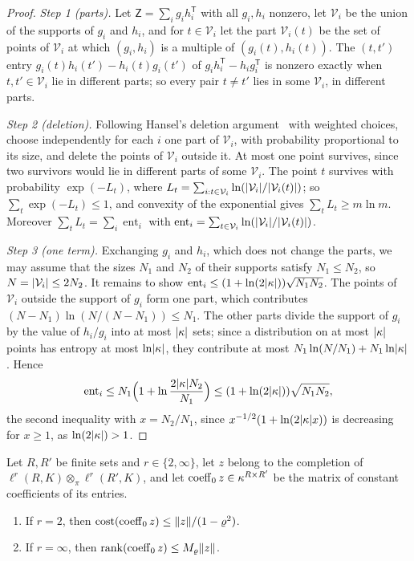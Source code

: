 \begin{proof}
\emph{Step 1 (parts).} Let $\mathsf Z=\sum_ig_ih_i^{\mathsf T}$ with all $g_i,h_i$ nonzero, let $\mathcal V_i$ be the
union of the supports of $g_i$ and $h_i$, and for $t\in\mathcal V_i$ let the part $\mathcal V_i(t)$ be the set of points
of $\mathcal V_i$ at which $(g_i,h_i)$ is a multiple of $(g_i(t),h_i(t))$. The $(t,t')$ entry
$g_i(t)h_i(t')-h_i(t)g_i(t')$ of $g_ih_i^{\mathsf T}-h_ig_i^{\mathsf T}$ is nonzero exactly when $t,t'\in\mathcal V_i$ lie
in different parts; so every pair $t\ne t'$ lies in some $\mathcal V_i$, in different parts.

\emph{Step 2 (deletion).} Following Hansel's deletion argument~\cite{Ha} with weighted choices, choose independently
for each $i$ one part of $\mathcal V_i$, with probability proportional to its size, and delete the points of $\mathcal V_i$
outside it. At most one point survives, since two survivors would lie in different parts of some $\mathcal V_i$. The
point $t$ survives with probability $\exp(-L_t)$, where
$L_t=\sum_{i:t\in\mathcal V_i}\ln(\lvert \mathcal V_i\rvert/\lvert \mathcal V_i(t)\rvert)$; so $\sum_t\exp(-L_t)\le1$, and convexity of
the exponential gives $\sum_tL_t\ge m\ln m$. Moreover $\sum_tL_t=\sum_i\operatorname{ent}_i$ with
$\operatorname{ent}_i=\sum_{t\in\mathcal V_i}\ln(\lvert \mathcal V_i\rvert/\lvert \mathcal V_i(t)\rvert)$.

\emph{Step 3 (one term).} Exchanging $g_i$ and $h_i$, which does not change the parts, we may assume that the sizes
$N_1$ and $N_2$ of their supports satisfy $N_1\le N_2$, so $N=\lvert \mathcal V_i\rvert\le2N_2$. It remains to show
$\operatorname{ent}_i\le(1+\ln(2\lvert \kappa\rvert))\sqrt{N_1N_2}$. The points of $\mathcal V_i$ outside the support of $g_i$ form one
part, which contributes $(N-N_1)\ln(N/(N-N_1))\le N_1$. The other parts divide the support of $g_i$ by the value of
$h_i/g_i$ into at most $\lvert \kappa\rvert$ sets; since a distribution on at most $\lvert \kappa\rvert$ points has entropy at most
$\ln\lvert \kappa\rvert$, they contribute at most $N_1\ln(N/N_1)+N_1\ln\lvert \kappa\rvert$. Hence
\[
 \operatorname{ent}_i\le N_1\Bigl(1+\ln\frac{2\lvert \kappa\rvert N_2}{N_1}\Bigr)\le(1+\ln(2\lvert \kappa\rvert))\sqrt{N_1N_2},
\]
the second inequality with $x=N_2/N_1$, since $x^{-1/2}(1+\ln(2\lvert \kappa\rvert x))$ is decreasing for $x\ge1$, as
$\ln(2\lvert \kappa\rvert)>1$.
\end{proof}

\begin{lemma}\label{fib:lem:coeff}
Let $R,R'$ be finite sets and $r\in\{2,\infty\}$, let $z$ belong to the completion of
$\ell^r(R,K)\otimes_\pi\ell^r(R',K)$, and let $\operatorname{coeff}_0z\in\kappa^{R\times R'}$ be the matrix of constant coefficients of
its entries.
\begin{enumerate}
\item If $r=2$, then $\operatorname{cost}(\operatorname{coeff}_0z)\le\lVert z\rVert/(1-\varrho^2)$.
\item If $r=\infty$, then $\operatorname{rank}(\operatorname{coeff}_0z)\le M_\varrho\lVert z\rVert$.
\end{enumerate}
\end{lemma}

